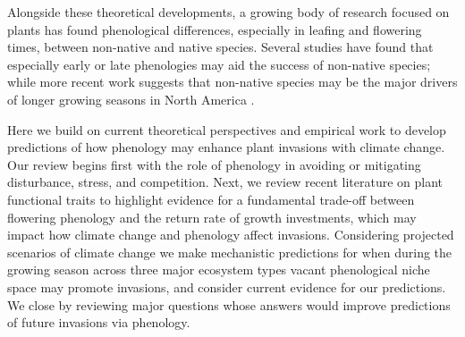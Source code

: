 \documentclass[11pt,a4paper,oneside]{article}
\begin{document}
Alongside these theoretical developments, a growing body of research focused on plants has found phenological differences, especially in leafing and flowering times, between non-native and native species. Several studies have found that especially early \citep{mcewan2009,Wilsey:2011cr,throop2012,Wainwright:2012tw} or late \citep{Godoy:2009dz,Fridley:2012fj,paquette2012,Pearson:2012uq} phenologies may aid the success of non-native species; while more recent work suggests that non-native species may be the major drivers of longer growing seasons in North America \citep{wolkovichAmBot2013}. %

Here we build on current theoretical perspectives and empirical work to develop predictions of how phenology may enhance plant invasions with climate change. Our review begins first with the role of phenology in avoiding or mitigating disturbance, stress, and competition. Next, we review recent literature on plant functional traits to highlight evidence for a fundamental trade-off between flowering phenology and the return rate of growth investments, which may impact how climate change and phenology affect invasions. Considering projected scenarios of climate change we make mechanistic predictions for when during the growing season across three major ecosystem types vacant phenological niche space may promote invasions, and consider current evidence for our predictions. We close by reviewing major questions whose answers would improve predictions of future invasions via phenology.\\
\end{document}

